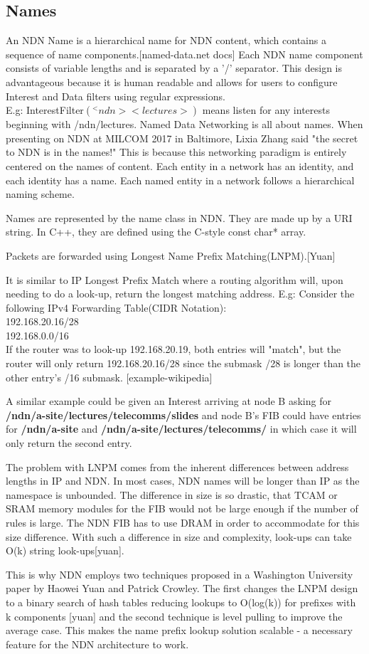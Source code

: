 \subsection{Names}
An NDN Name is a hierarchical name for NDN content, which contains a sequence of name components.[named-data.net docs] Each NDN name component  consists of variable lengths and is separated by a '/' separator. This design is advantageous because it is human readable and allows for users to configure Interest and Data filters using regular expressions. \\
E.g: InterestFilter$(^<ndn><lectures>)$ means listen for any interests beginning with /ndn/lectures. 
Named Data Networking is all about names. When presenting on NDN at MILCOM 2017 in Baltimore, Lixia Zhang said "the secret to NDN is in the names!" This is because this networking paradigm  is entirely centered on the names of content. Each entity in a network has an identity, and each identity has a name. Each named entity in a network follows a hierarchical naming scheme.\par
Names are represented by the name class in NDN. They are made up by a URI string. In C++, they are defined using the C-style const char* array. \par
Packets are forwarded using Longest Name Prefix Matching(LNPM).[Yuan] 

It is similar to IP Longest Prefix Match where a routing algorithm will, upon needing to do a look-up, return the longest matching address. E.g:
Consider the following IPv4 Forwarding Table(CIDR Notation):\\
192.168.20.16/28\\
192.168.0.0/16\\
If the router was to look-up 192.168.20.19, both entries will "match", but the router will only return 192.168.20.16/28 since the submask /28 is longer than the other entry's /16 submask. [example-wikipedia]

A similar example could be given an Interest arriving at node B asking for \textbf{/ndn/a-site/lectures/telecomms/slides}  and node B's FIB could have entries for \textbf{/ndn/a-site} and \textbf{/ndn/a-site/lectures/telecomms/} in which case it will only return the second entry. \par 

The problem with LNPM comes from the inherent differences between address lengths in IP and NDN. In most cases, NDN names will be longer than IP as the namespace is unbounded. The difference in size is so drastic, that TCAM or SRAM memory modules for the FIB would not be large enough if the number of rules is large. The NDN FIB has to use DRAM in order to accommodate for this size difference. With such a difference in size and complexity, look-ups can take O(k) string look-ups[yuan].\par 
This is why NDN employs two techniques proposed in a Washington University paper by Haowei Yuan and Patrick Crowley. The first changes the LNPM design to a binary search of hash tables reducing lookups to O(log(k)) for prefixes with k components [yuan] and the second technique is level pulling to improve the average case. This makes the name prefix lookup solution scalable - a necessary feature for the NDN architecture to work. 
